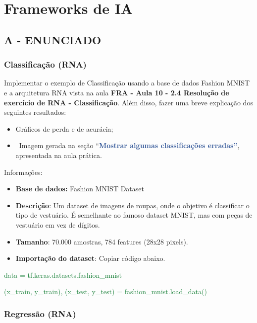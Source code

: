 \label{ap:ap13}
\chapter{Frameworks de IA}
\section*{\textbf{A - ENUNCIADO}}

\subsection{Classificação (RNA)}


Implementar o exemplo de Classificação usando a base de dados Fashion MNIST e a arquitetura RNA vista na aula
\textbf{FRA - Aula 10 - 2.4 Resolução de exercício de RNA - Classificação}. Além disso, fazer uma breve explicação dos
seguintes resultados: 

\begin{itemize}[series=listWWNumxiv,label={}-]
\item Gráficos de perda e de acurácia;
\item \ Imagem gerada na seção “\textbf{\textcolor[HTML]{2F5496}{Mostrar algumas classificações erradas”}}, apresentada
na aula prática.
\end{itemize}
Informações:

\begin{itemize}[series=listWWNumxiii,label=${\bullet}$]
\item \textbf{Base de dados: }Fashion MNIST Dataset 
\item \textbf{Descrição}: Um dataset de imagens de roupas, onde o objetivo é classificar o tipo de vestuário. É
semelhante ao famoso dataset MNIST, mas com peças de vestuário em vez de dígitos.
\item \textbf{Tamanho}: 70.000 amostras, 784 features (28x28 pixels).
\end{itemize}
\begin{itemize}[series=listWWNumxvi,label=${\bullet}$]
\item \textbf{Importação do dataset}: Copiar código abaixo.
\end{itemize}

\foreignlanguage{english}{\textcolor[HTML]{188038}{data = tf.keras.datasets.fashion\_mnist }}

\foreignlanguage{english}{\textcolor[HTML]{188038}{(x\_train, y\_train), (x\_test, y\_test) =
fashion\_mnist.load\_data()}}


\subsection{Regressão (RNA)}


